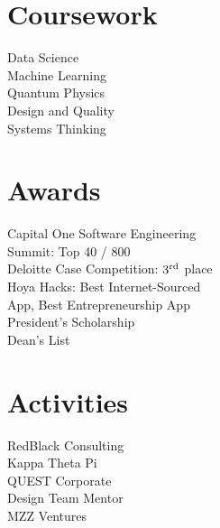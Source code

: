 \documentclass[]{deedy-resume}
\begin{document}
\begin{minipage}[t][.7\textheight][t]{0.33\textwidth}

\section{Coursework}
Data Science \\
Machine Learning \\
Quantum Physics \\
Design and Quality \\
Systems Thinking \\
\sectionsep %


\section{Awards}
Capital One Software Engineering \\
\hspace{4pt} Summit: Top 40 / 800 \\
Deloitte Case Competition: \( 3\textsuperscript{rd} \) place \\
Hoya Hacks: Best Internet-Sourced \\
\hspace{4pt} App, Best Entrepreneurship App \\
President's Scholarship \\
Dean's List \\
\sectionsep %

\section{Activities}
RedBlack Consulting \\
Kappa Theta Pi \\
QUEST Corporate \\
Design Team Mentor \\
MZZ Ventures \\
\sectionsep %
%
%

\end{minipage} 
\hfill
\end{document}
